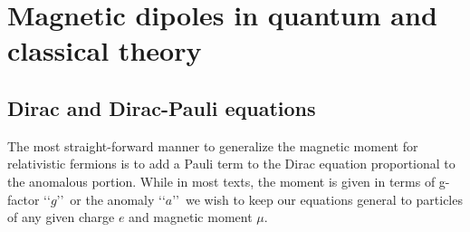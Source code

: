 \chapter{Magnetic dipoles in quantum and classical theory}

\section{Dirac and Dirac-Pauli equations}\label{ajsss:diracpauli}
The most straight-forward manner to generalize the magnetic moment for relativistic fermions is to add a Pauli term to the Dirac equation proportional to the anomalous portion. While in most texts, the moment is given in terms of g-factor \lq\lq$g$\rq\rq\ or the anomaly \lq\lq$a$\rq\rq\ we wish to keep our equations general to particles of any given charge $e$ and magnetic moment $\mu$.

